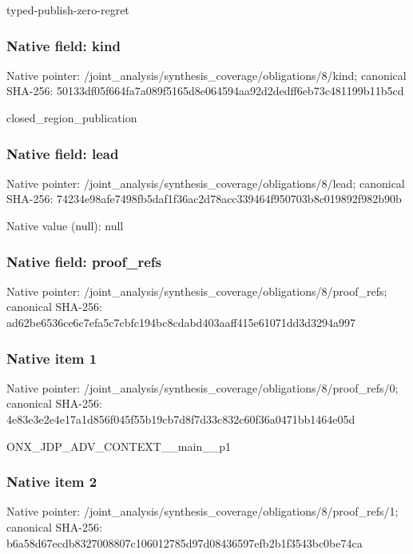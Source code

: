 \documentclass[10pt,a4paper]{article}
\begin{document}
\begingroup\raggedright\sloppy typed-publish-zero-regret\par\endgroup

\subsubsection{Native field: kind}
Native pointer: /joint\_\allowbreak{}analysis/synthesis\_\allowbreak{}coverage/obligations/8/kind; canonical SHA-256: 50133df05f664fa7a089f5165d8e064594aa92d2dedff6eb73c481199b11b5cd

\begingroup\raggedright\sloppy closed\_\allowbreak{}region\_\allowbreak{}publication\par\endgroup

\subsubsection{Native field: lead}
Native pointer: /joint\_\allowbreak{}analysis/synthesis\_\allowbreak{}coverage/obligations/8/lead; canonical SHA-256: 74234e98afe7498fb5daf1f36ac2d78acc339464f950703b8c019892f982b90b

Native value (null): null

\subsubsection{Native field: proof\_\allowbreak{}refs}
Native pointer: /joint\_\allowbreak{}analysis/synthesis\_\allowbreak{}coverage/obligations/8/proof\_\allowbreak{}refs; canonical SHA-256: ad62be6536ce6c7efa5c7cbfc194bc8cdabd403aaff415e61071dd3d3294a997

\subsubsection{Native item 1}
Native pointer: /joint\_\allowbreak{}analysis/synthesis\_\allowbreak{}coverage/obligations/8/proof\_\allowbreak{}refs/0; canonical SHA-256: 4e83e3e2e4e17a1d856f045f55b19cb7d8f7d33c832c60f36a0471bb1464e05d

\begingroup\raggedright\sloppy ONX\_\allowbreak{}JDP\_\allowbreak{}ADV\_\allowbreak{}CONTEXT\_\allowbreak{}\_\allowbreak{}main\_\allowbreak{}\_\allowbreak{}p1\par\endgroup

\subsubsection{Native item 2}
Native pointer: /joint\_\allowbreak{}analysis/synthesis\_\allowbreak{}coverage/obligations/8/proof\_\allowbreak{}refs/1; canonical SHA-256: b6a58d67ecdb8327008807c106012785d97d08436597efb2b1f3543bc0be74ca
\end{document}
